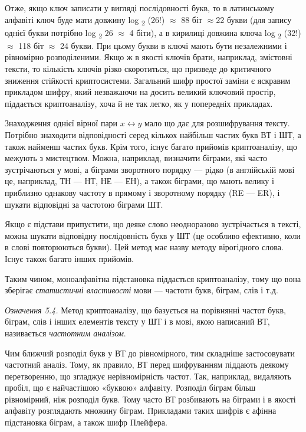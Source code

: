 Отже, якщо ключ записати у вигляді послідовності букв, то в латинському алфавіті
ключ буде мати довжину  log \textsubscript{2 }(26!) $\approx$ 88 біт
$\approx$22 букви  (для запису однієї букви потрібно log \textsubscript{2 }26
$\approx$ 4 біти), а в кирилиці довжина ключа  log \textsubscript{2 }(32!)
$\approx$ 118 біт $\approx$ 24 букви. При цьому букви в ключі мають бути
незалежними і рівномірно розподіленими. Якщо ж в якості ключів брати,
наприклад, змістовні тексти, то кількість ключів різко скоротиться, що призведе
до критичного зниження стійкості криптосистеми. Загальний шифр простої заміни є
яскравим прикладом шифру, який незважаючи на досить великий ключовий простір,
піддається криптоаналізу, хоча й не так легко, як у попередніх прикладах.

Знаходження однієї вірної пари   $x\leftrightarrow y$ мало що дає для
розшифрування тексту. Потрібно знаходити відповідності серед кількох найбільш
частих букв ВТ і ШТ, а також найменш частих букв. Крім того, існує багато
прийомів криптоаналізу, що межують з мистецтвом. Можна, наприклад, визначити
біграми, які часто зустрічаються у мові, а  біграми зворотного порядку --- рідко
(в англійській мові це, наприклад, ТН --- НТ, НЕ --- ЕН), а також біграми, що мають
велику і приблизно однакову частоту в прямому і зворотному порядку (RE --- ER), і
шукати відповідні за частотою  біграми ШТ.

Якщо є підстави припустити, що деяке слово неодноразово зустрічається в тексті,
можна шукати відповідну послідовність букв у ШТ (це особливо ефективно, коли в
слові повторюються букви). Цей метод має назву методу вірогідного слова. Існує
також багато інших прийомів.

Таким чином, моноалфавітна підстановка піддається криптоаналізу, тому що вона
зберігає \textit{статистичні властивості} мови --- частоти букв, біграм, слів і
т.д.

\textit{Означення 5.4.}\textit{ }Метод криптоаналізу, що базується на порівнянні
частот букв, біграм, слів і інших елементів тексту у ШТ і в мові, якою
написаний ВТ, називається \textit{частотним аналізом}.

Чим ближчий розподіл букв у ВТ до рівномірного, тим складніше застосовувати
частотний аналіз. Тому, як правило, ВТ перед шифруванням піддають деякому
перетворенню, що згладжує нерівномірність частот. Так, наприклад, видаляють
пробіл, що є найчастішою «буквою» алфавіту. Розподіл біграм більш рівномірний,
ніж розподіл букв. Тому часто ВТ розбивають на біграми і в якості алфавіту
розглядають множину біграм. Прикладами таких шифрів є афінна підстановка
біграм, а також шифр Плейфера.


